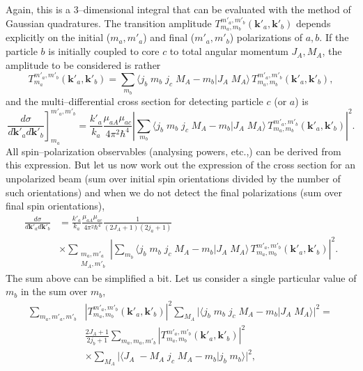 Again, this is a 3--dimensional integral that can be evaluated with the method of Gaussian quadratures. The transition amplitude $T_{m_a,m_b}^{m'_a,m'_b}(\mathbf{k}'_a,\mathbf{k}'_b)$ depends explicitly on the initial ($m_a,m'_a$) and final ($m'_a,m'_b$) polarizations of $a,b$. If the particle $b$ is initially coupled to core $c$ to total angular momentum $J_A,M_A$, the amplitude to be considered is rather
\begin{equation}\label{eqC6AppG45}
T_{m_a}^{m'_a,m'_b}(\mathbf{k}'_a,\mathbf{k}'_b)=\sum_{m_b}\langle j_b\;m_b\;j_c\;M_A-m_b|J_A\;M_A\rangle\, T_{m_a,m_b}^{m'_a,m'_b}(\mathbf{k}'_a,\mathbf{k}'_b),
\end{equation}
and the multi--differential cross section for detecting particle $c$ (or $a$) is
\begin{equation}\label{eqC6AppG46}
\left.\frac{d\sigma}{d\mathbf{k}'_ad\mathbf{k}'_b}\right]_{m_a}^{m'_a,m'_b}=\frac{k'_a}{k_a}\frac{\mu_{aA}\mu_{ac}}{4\pi^2\hbar^4}\left|\sum_{m_b}\langle j_b\;m_b\;j_c\;M_A-m_b|J_A\;M_A\rangle\, T_{m_a,m_b}^{m'_a,m'_b}(\mathbf{k}'_a,\mathbf{k}'_b)\right|^2.
\end{equation}
All spin--polarization observables (analysing powers, etc.,) can be derived from this expression. But let us now work out the expression of the cross section for an unpolarized beam (sum over initial spin orientations divided by the number of such orientations) and when we do not detect the final polarizations (sum over final spin orientations), 
\begin{equation}\label{eqC6AppG47}
\begin{split}
\frac{d\sigma}{d\mathbf{k}'_ad\mathbf{k}'_b}&=\frac{k'_a}{k_a}\frac{\mu_{aA}\mu_{ac}}{4\pi^2\hbar^4}\frac{1}{(2J_A+1)(2j_a+1)}\\
&\times \sum_{\substack{m_a,m'_a\\M_A,m'_b}}\left|\sum_{m_b}\langle j_b\;m_b\;j_c\;M_A-m_b|J_A\;M_A\rangle\, T_{m_a,m_b}^{m'_a,m'_b}(\mathbf{k}'_a,\mathbf{k}'_b)\right|^2.
\end{split}
\end{equation}
The sum above can be simplified a bit. Let us consider a single particular value of $m_b$ in the sum over $m_b$,
\begin{equation}\label{eqC6AppG48}
\begin{split}
\sum_{m_a,m'_a,m'_b}&\left|T_{m_a,m_b}^{m'_a,m'_b}(\mathbf{k}'_a,\mathbf{k}'_b)\right|^2\sum_{M_A}\Big|\langle j_b\;m_b\;j_c\;M_A-m_b|J_A\;M_A\rangle\Big|^2=\\
&\frac{2J_A+1}{2j_b+1}\sum_{m_a,m_a,m'_b}\left|T_{m_a,m_b}^{m'_a,m'_b}(\mathbf{k}'_a,\mathbf{k}'_b)\right|^2\\
&\times\sum_{M_A}\Big|\langle J_A\;-M_A\;j_c\;M_A-m_b|j_b\;m_b\rangle\Big|^2,
\end{split}
\end{equation}
